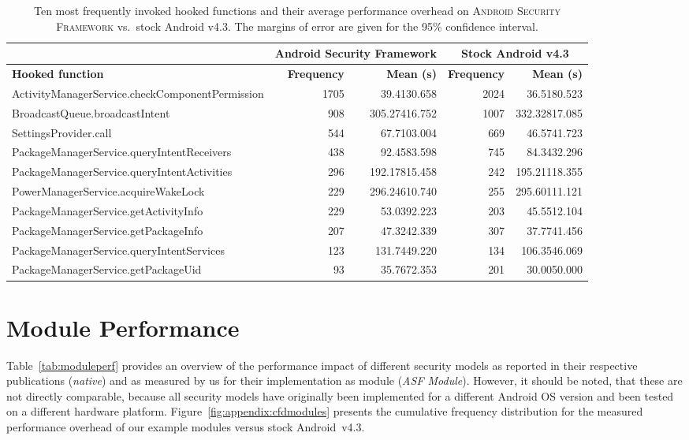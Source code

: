 \documentclass[letterpaper,twocolumn,10pt]{article}
\newcommand{\OURNAME}{\textsc{Android Security Framework}\xspace}
\newcommand{\OURSHORT}{\textsc{ASF}\xspace}
\begin{document}
\begin{table*}[h]
  \centering
  \footnotesize
  \begin{tabular}{|l|r|r|r|r|}\cline{2-5}
    \multicolumn{1}{l}{} & \multicolumn{2}{|c|}{\textbf{Android Security Framework}} & \multicolumn{2}{c|}{\textbf{Stock Android v4.3}}\\\hline
    \textbf{Hooked function} & \textbf{Frequency} & \textbf{Mean (s)}  & \textbf{Frequency} & \textbf{Mean (s)}\\\hline\hline
    ActivityManagerService.checkComponentPermission & 1705 & 39.4130.658 & 2024 & 36.5180.523\\\hline
    BroadcastQueue.broadcastIntent & 908 & 305.27416.752 & 1007 & 332.32817.085\\\hline
    SettingsProvider.call & 544 & 67.7103.004 & 669 & 46.5741.723\\\hline
    PackageManagerService.queryIntentReceivers & 438 & 92.4583.598 & 745 & 84.3432.296\\\hline
    PackageManagerService.queryIntentActivities & 296 & 192.17815.458 & 242 & 195.21118.355\\\hline
    PowerManagerService.acquireWakeLock & 229 & 296.24610.740 & 255 & 295.60111.121\\\hline
    PackageManagerService.getActivityInfo & 229 & 53.0392.223 & 203 & 45.5512.104\\\hline
    PackageManagerService.getPackageInfo & 207 & 47.3242.339 & 307 & 37.7741.456\\\hline
    PackageManagerService.queryIntentServices & 123 & 131.7449.220 & 134 & 106.3546.069\\\hline
    PackageManagerService.getPackageUid & 93 & 35.7672.353 & 201 & 30.0050.000\\\hline
  \end{tabular}
  \caption{Ten most frequently invoked hooked functions and their average performance overhead on \OURNAME vs.~stock Android v4.3. The margins of error are given for the 95\% confidence interval.}
  \label{tab:eval:tophooks}
\end{table*}

\section{Module Performance}
\label{sec:appendix:moduleperf}

Table~\ref{tab:moduleperf} provides an overview of the performance impact of different security models as reported in their respective publications (\textit{native}) and as measured by us for their implementation as module (\textit{\OURSHORT Module}). However, it should be noted, that these are not directly comparable, because all security models have originally been implemented for a different Android OS version and been tested on a different hardware platform. Figure~\ref{fig:appendix:cfdmodules} presents the cumulative frequency distribution for the measured performance overhead of our example modules versus stock Android~v4.3.
\end{document}
